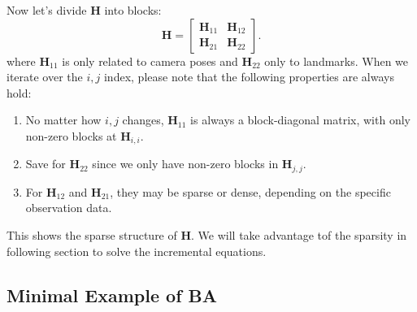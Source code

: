 Now let's divide $\mathbf{H}$ into blocks: 
\begin{equation}
	\label{eq:H-blocks}
	\mathbf{H} = \left[ {\begin{array}{*{20}{c}}
			{{\mathbf{H}_{11}}}&{{\mathbf{H}_{12}}}\\
			{{\mathbf{H}_{21}}}&{{\mathbf{H}_{22}}}
	\end{array}} \right] .
\end{equation}
where $\mathbf{H}_{11}$ is only related to camera poses and $\mathbf{H}_{22}$ only to landmarks. When we iterate over the $i,j$ index, please note that the following properties are always hold:
\begin{enumerate}
	\item No matter how $i,j$ changes, $\mathbf{H}_{11}$ is always a block-diagonal matrix, with only non-zero blocks at $\mathbf{H}_{i,i}$.
	\item Save for $\mathbf{H}_{22}$ since we only have non-zero blocks in $\mathbf{H}_{j,j}$. 
	\item  For $\mathbf{H}_{12}$ and $\mathbf{H}_{21}$, they may be sparse or dense, depending on the specific observation data.
\end{enumerate}
This shows the sparse structure of $\mathbf{H}$. We will take advantage tof the sparsity in following section to solve the incremental equations. 

\subsection{Minimal Example of BA}

